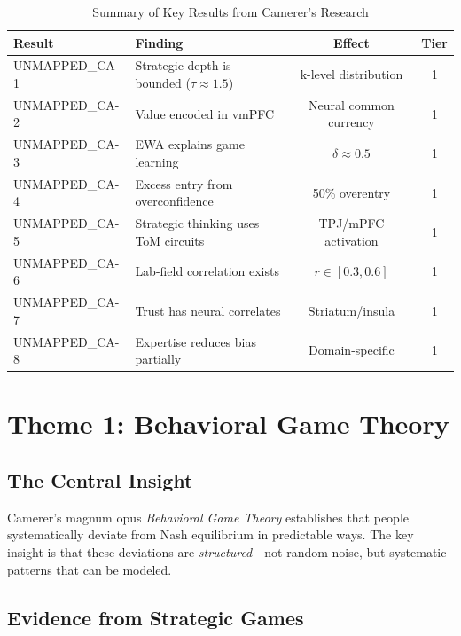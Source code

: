 \begin{table}[htbp]
\centering
\caption{Summary of Key Results from Camerer's Research}
\label{tab:ca-key-results}
\renewcommand{\arraystretch}{1.3}
\begin{tabular}{@{}llcc@{}}
\toprule
\textbf{Result} & \textbf{Finding} & \textbf{Effect} & \textbf{Tier} \\
\midrule
UNMAPPED_CA-1 & Strategic depth is bounded ($\tau \approx 1.5$) & k-level distribution & 1 \\
UNMAPPED_CA-2 & Value encoded in vmPFC & Neural common currency & 1 \\
UNMAPPED_CA-3 & EWA explains game learning & $\delta \approx 0.5$ & 1 \\
UNMAPPED_CA-4 & Excess entry from overconfidence & 50\% overentry & 1 \\
UNMAPPED_CA-5 & Strategic thinking uses ToM circuits & TPJ/mPFC activation & 1 \\
UNMAPPED_CA-6 & Lab-field correlation exists & $r \in [0.3, 0.6]$ & 1 \\
UNMAPPED_CA-7 & Trust has neural correlates & Striatum/insula & 1 \\
UNMAPPED_CA-8 & Expertise reduces bias partially & Domain-specific & 1 \\
\bottomrule
\end{tabular}
\end{table}


\section{Theme 1: Behavioral Game Theory}
\label{sec:ca-bgt}

\subsection{The Central Insight}

Camerer's magnum opus \textit{Behavioral Game Theory} \citep{camerer2003behavioralbehavioral} establishes that people systematically deviate from Nash equilibrium in predictable ways. The key insight is that these deviations are \textit{structured}---not random noise, but systematic patterns that can be modeled.

\subsection{Evidence from Strategic Games}

